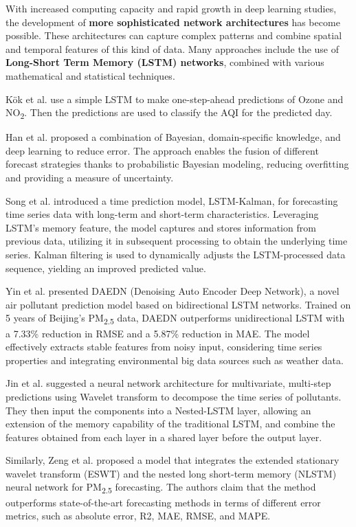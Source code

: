 With increased computing capacity and rapid growth in deep learning studies, the development of \textbf{more sophisticated network architectures} has become possible. These architectures can capture complex patterns and combine spatial and temporal features of this kind of data.
Many approaches include the use of \textbf{Long-Short Term Memory (LSTM) networks}, combined with various mathematical and statistical techniques.

\noindent K\"{o}k et al. \cite{8258144} use a simple LSTM to make one-step-ahead predictions of Ozone and NO\textsubscript{2}. Then the predictions are used to classify the AQI for the predicted day.

\noindent Han et al. \cite{9127775} proposed a combination of Bayesian, domain-specific knowledge, and deep learning to reduce error. The approach enables the fusion of different forecast strategies thanks to probabilistic Bayesian modeling, reducing overfitting and providing a measure of uncertainty.

\noindent Song et al. \cite{lstmkalman} introduced a time prediction model, LSTM-Kalman, for forecasting time series data with long-term and short-term characteristics. Leveraging LSTM's memory feature, the model captures and stores information from previous data, utilizing it in subsequent processing to obtain the underlying time series. Kalman filtering is used to dynamically adjusts the LSTM-processed data sequence, yielding an improved predicted value.

\noindent Yin et al. \cite{Yin2020} presented DAEDN (Denoising Auto Encoder Deep Network), a novel air pollutant prediction model based on bidirectional LSTM networks. Trained on 5 years of Beijing's PM\textsubscript{2.5} data, DAEDN outperforms unidirectional LSTM with a 7.33\% reduction in RMSE and a 5.87\% reduction in MAE. The model effectively extracts stable features from noisy input, considering time series properties and integrating environmental big data sources such as weather data.

\noindent Jin et al. \cite{WaveletNLSTM} suggested a neural network architecture for multivariate, multi-step predictions using Wavelet transform to decompose the time series of pollutants. They then input the components into a Nested-LSTM layer, allowing an extension of the memory capability of the traditional LSTM, and combine the features obtained from each layer in a shared layer before the output layer.

\noindent Similarly, Zeng et al. \cite{ZENG2022108822} proposed a model that integrates the extended stationary wavelet transform (ESWT) and the nested long short-term memory (NLSTM) neural network for PM\textsubscript{2.5} forecasting. The authors claim that the method outperforms state-of-the-art forecasting methods in terms of different error metrics, such as absolute error, R2, MAE, RMSE, and MAPE.\\


